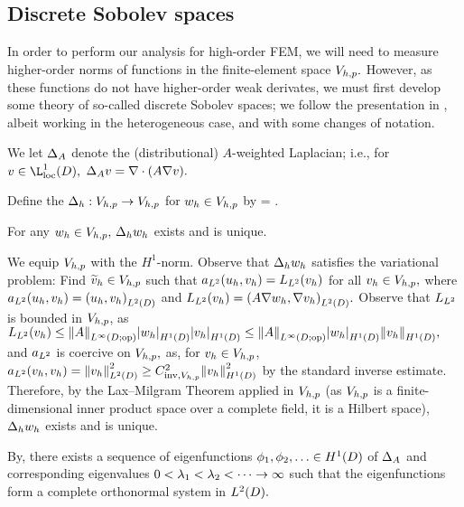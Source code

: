 \subsection{Discrete Sobolev spaces}\label{sec:discsob}
In order to perform our analysis for high-order FEM, we will need to measure higher-order norms of functions in the finite-element space $V_{h,p}.$ However, as these functions do not have higher-order weak derivates, we must first develop some theory of so-called discrete Sobolev spaces; we follow the presentation in \cite{DuWu:15}, albeit working in the heterogeneous case, and with some changes of notation.

We let $\Delta_{A}$ denote the (distributional) $A$-weighted Laplacian; i.e., for $v \in \LolocD,$ $\DeltaA v = \grad\cdot\mleft(A\grad v\mright).$

Define the  $\Delta_{h}:V_{h,p}\rightarrow V_{h,p}$ for $w_{h} \in V_{h,p}$ by
\beqs
\IPLtD{\Deltah \wh}{\vh} =  \tforall \vh \in \Vhp.
\eeqs
\ede

\label{lem:ddwd}
For any $w_{h} \in V_{h,p},$ $\Delta_{h} w_{h}$ exists and is unique.
\ele

We equip $V_{h,p}$ with the $H^1$-norm. Observe that $\Delta_{h} w_{h}$ satisfies the variational problem: Find $\widetilde{v}_{h}  \in V_{h,p}$ such that $a_{L^{2}}(u_{h},v_{h}) = L_{L^{2}}(v_{h})$ for all $v_{h} \in V_{h,p},$ where $\add(\uh,\vh) = \IPLtD{\uh}{\vh}$ and $\Ldd(\vh) = \IPLtD{A \grad \wh}{\grad \vh}.$ Observe that $L_{L^{2}}$ is bounded in $V_{h,p}$, as $\Ldd(\vh) \leq \NLiDop{A} \SNHoD{\wh}\SNHoD{\vh} \leq \NLiDop{A} \SNHoD{\wh}\NHoD{\vh},$ and $a_{L^{2}}$ is coercive on $V_{h,p},$ as, for $v_{h} \in V_{h,p}$, $\add(\vh,\vh) = \NLtD{\vh}^2 \geq \CinvVhp^2 \NHoD{\vh}^2$ by the standard inverse estimate. Therefore, by the Lax--Milgram Theorem applied in $V_{h,p}$ (as $V_{h,p}$ is a finite-dimensional inner product space over a complete field, it is a Hilbert space), $\Delta_{h} w_{h}$ exists and is unique.
\epf

By, there exists a sequence of eigenfunctions $\phio,\phit,\ldots \in \HoD$ of $\Delta_{A}$ and corresponding eigenvalues $0 < \lambda_{1}<\lambda_{2} < \cdots \rightarrow\infty$ such that the eigenfunctions form a complete orthonormal system in $\LtD.$

